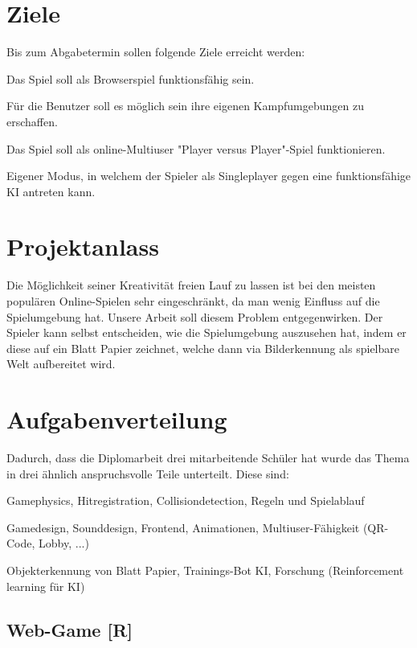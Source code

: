 \section{Ziele}
Bis zum Abgabetermin sollen folgende Ziele erreicht werden:
\begin{compactitem}
    \item Das Spiel soll als Browserspiel funktionsfähig sein.
    \item Für die Benutzer soll es möglich sein ihre eigenen Kampfumgebungen zu erschaffen.
    \item Das Spiel soll als online-Multiuser "Player versus Player"-Spiel funktionieren.
    \item Eigener Modus, in welchem der Spieler als Singleplayer gegen eine funktionsfähige KI antreten kann.
\end{compactitem}

\section{Projektanlass}
Die Möglichkeit seiner Kreativität freien Lauf zu lassen ist bei den meisten populären
Online-Spielen sehr eingeschränkt, da man wenig Einfluss auf die Spielumgebung hat.
Unsere Arbeit soll diesem Problem entgegenwirken. Der Spieler kann selbst entscheiden,
wie die Spielumgebung auszusehen hat, indem er diese auf ein Blatt Papier zeichnet,
welche dann via Bilderkennung als spielbare Welt aufbereitet wird.


\section{Aufgabenverteilung}
Dadurch, dass die Diplomarbeit drei mitarbeitende Schüler hat wurde das Thema in drei ähnlich
anspruchsvolle Teile unterteilt. Diese sind:
\begin{compactitem}
    \item Gamephysics, Hitregistration, Collisiondetection, Regeln und Spielablauf
    \item Gamedesign, Sounddesign, Frontend, Animationen, Multiuser-Fähigkeit (QR-Code, Lobby, ...)
    \item Objekterkennung von Blatt Papier, Trainings-Bot KI, Forschung (Reinforcement learning für KI)
\end{compactitem}

\subsection{Web-Game [R]}
